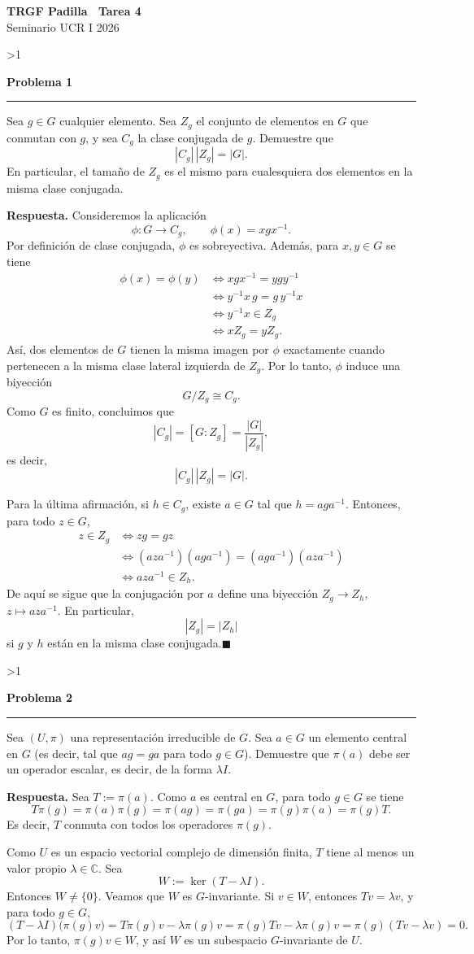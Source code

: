\documentclass[10pt,a4paper]{article}
\newcommand{\CC}{\mathbb{C}}
\newcommand{\inlinehead}[2][repblue]{%
  \par\smallskip
  {\color{#1}\bfseries #2.}\hspace{0.45em}%
}
\newcommand{\topbanner}{%
  \begin{tcolorbox}[
    colback=replight,
    colframe=repline,
    borderline west={1.2pt}{0pt}{repblue},
    borderline east={1.2pt}{0pt}{repteal},
    left=1.0em,
    right=1.0em,
    top=0.7em,
    bottom=0.55em
  ]
    {\Large\bfseries\color{repblue} TRGF Padilla \textemdash\ Tarea 4}\\[-0.1em]
    {\normalsize\color{repteal} Seminario UCR I 2026}
  \end{tcolorbox}
}
\newcounter{probcnt}
\newcommand{\problem}[2]{%
  \stepcounter{probcnt}%
  \ifnum\value{probcnt}>1\newpage\fi
  \par\vspace{0.25em}
  {\large\bfseries\color{repblue} Problema #1}\par
  {\color{repline}\rule{\linewidth}{0.55pt}}\par
  \begin{tcolorbox}[
    breakable,
    colback=white,
    colframe=repline,
    borderline west={1.6pt}{0pt}{repteal},
    left=0.7em,
    right=0.7em,
    top=0.35em,
    bottom=0.3em,
    before skip=0.35em,
    after skip=0.45em
  ]
    #2
  \end{tcolorbox}
}
\begin{document}
\color{black}
\topbanner
\small

\problem{1}{%
Sea $g\in G$ cualquier elemento. Sea $Z_g$ el conjunto de elementos en $G$
que conmutan con $g$, y sea $C_g$ la clase conjugada de $g$. Demuestre que
\[
  |C_g|\,|Z_g| = |G|.
\]
En particular, el tamaño de $Z_g$ es el mismo para cualesquiera dos elementos
en la misma clase conjugada.
}

\inlinehead{Respuesta} Consideremos la aplicación
\[
  \phi\colon G \to C_g,
  \qquad
  \phi(x)=xgx^{-1}.
\]
Por definición de clase conjugada, $\phi$ es sobreyectiva. Además, para
$x,y\in G$ se tiene
\begin{align*}
  \phi(x)=\phi(y)
  &\iff xgx^{-1}=ygy^{-1} \\
  &\iff y^{-1}x\,g=g\,y^{-1}x \\
  &\iff y^{-1}x\in Z_g \\
  &\iff xZ_g=yZ_g.
\end{align*}
Así, dos elementos de $G$ tienen la misma imagen por $\phi$ exactamente cuando
pertenecen a la misma clase lateral izquierda de $Z_g$. Por lo tanto,
$\phi$ induce una biyección
\[
  G/Z_g \cong C_g.
\]
Como $G$ es finito, concluimos que
\[
  |C_g|=[G:Z_g]=\frac{|G|}{|Z_g|},
\]
es decir,
\[
  |C_g|\,|Z_g|=|G|.
\]

Para la última afirmación, si $h\in C_g$, existe $a\in G$ tal que
$h=aga^{-1}$. Entonces, para todo $z\in G$,
\begin{align*}
  z\in Z_g
  &\iff zg=gz \\
  &\iff (aza^{-1})(aga^{-1})=(aga^{-1})(aza^{-1}) \\
  &\iff aza^{-1}\in Z_h.
\end{align*}
De aquí se sigue que la conjugación por $a$ define una biyección
$Z_g \to Z_h$, $z\mapsto aza^{-1}$. En particular,
\[
  |Z_g|=|Z_h|
\]
si $g$ y $h$ están en la misma clase conjugada.\hfill$\blacksquare$

\problem{2}{%
Sea $(U,\pi)$ una representación irreducible de $G$. Sea $a\in G$ un elemento
central en $G$ (es decir, tal que $ag = ga$ para todo $g\in G$). Demuestre
que $\pi(a)$ debe ser un operador escalar, es decir, de la forma $\lambda I$.
}

\inlinehead{Respuesta} Sea $T:=\pi(a)$. Como $a$ es central en $G$, para todo
$g\in G$ se tiene
\[
  T\pi(g)=\pi(a)\pi(g)=\pi(ag)=\pi(ga)=\pi(g)\pi(a)=\pi(g)T.
\]
Es decir, $T$ conmuta con todos los operadores $\pi(g)$.

Como $U$ es un espacio vectorial complejo de dimensión finita, $T$ tiene al
menos un valor propio $\lambda\in\CC$. Sea
\[
  W:=\ker(T-\lambda I).
\]
Entonces $W\neq\{0\}$. Veamos que $W$ es $G$-invariante. Si $v\in W$, entonces
$Tv=\lambda v$, y para todo $g\in G$,
\[
  (T-\lambda I)\bigl(\pi(g)v\bigr)
  = T\pi(g)v-\lambda\pi(g)v
  = \pi(g)Tv-\lambda\pi(g)v
  = \pi(g)(Tv-\lambda v)=0.
\]
Por lo tanto, $\pi(g)v\in W$, y así $W$ es un subespacio $G$-invariante de
$U$.
\end{document}
